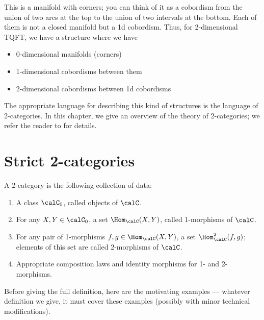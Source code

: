 This is a manifold with corners; you can think of it as a cobordism from the
union of two arcs at the top to the union of two intervals at the bottom. Each
of them is not a closed manifold but a 1d cobordism. Thus, for 2-dimensional
TQFT,  we have a structure where we have
\begin{itemize}
  \item 0-dimensional manifolds (corners)
  \item 1-dimensional cobordisms between them
  \item 2-dimensional cobordisms between 1d cobordisms
\end{itemize}

The appropriate language for describing this kind of structures is the
language of 2-categories. In this chapter, we give an overview of the theory
of 2-categories; we refer the reader to  for details.

\section{Strict 2-categories}\label{s:2cat-strict}
\begin{predefinition}\label{d:2-cat-prelim}
  A 2-category is the following collection of data:
  \begin{enumerate}
    \item A class $\calC_0$, called objects of $\calC$.
    \item For any $X,Y\in \calC_0$, a set $\Hom_{\calC}(X,Y)$,
    called 1-morphisms of $\calC$.
    \item For any pair of 1-morphisms $f,g\in \Hom_\calC(X,Y)$, a set
      $\Hom^2_{\calC}(f,g)$; elements of this set are called
      2-morphisms of $\calC$.
    \item Appropriate composition laws and identity morphisms for 1-
      and 2-morphisms.
  \end{enumerate}
\end{predefinition}
Before giving the full definition, here are the motivating examples ---
whatever definition we give, it must cover these examples (possibly with minor
technical modifications).

